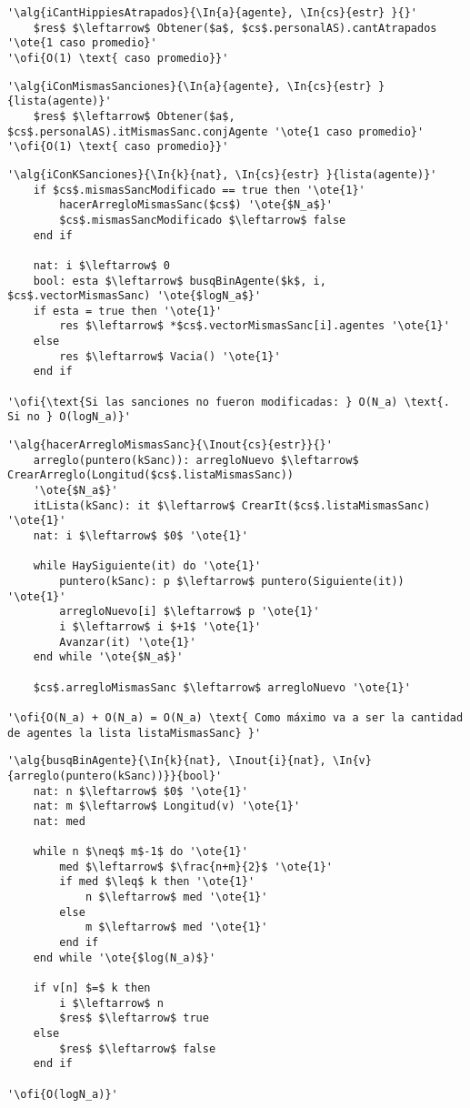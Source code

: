 \begin{lstlisting}[mathescape]
'\alg{iCantHippiesAtrapados}{\In{a}{agente}, \In{cs}{estr} }{}'
	$res$ $\leftarrow$ Obtener($a$, $cs$.personalAS).cantAtrapados '\ote{1 caso promedio}'
'\ofi{O(1) \text{ caso promedio}}'
\end{lstlisting}

\begin{lstlisting}[mathescape]
'\alg{iConMismasSanciones}{\In{a}{agente}, \In{cs}{estr} }{lista(agente)}'
	$res$ $\leftarrow$ Obtener($a$, $cs$.personalAS).itMismasSanc.conjAgente '\ote{1 caso promedio}'
'\ofi{O(1) \text{ caso promedio}}'
\end{lstlisting}

\begin{lstlisting}[mathescape]
'\alg{iConKSanciones}{\In{k}{nat}, \In{cs}{estr} }{lista(agente)}'
	if $cs$.mismasSancModificado == true then '\ote{1}'
		hacerArregloMismasSanc($cs$) '\ote{$N_a$}'
		$cs$.mismasSancModificado $\leftarrow$ false
	end if

	nat: i $\leftarrow$ 0
	bool: esta $\leftarrow$ busqBinAgente($k$, i, $cs$.vectorMismasSanc) '\ote{$logN_a$}'
	if esta = true then '\ote{1}'
		res $\leftarrow$ *$cs$.vectorMismasSanc[i].agentes '\ote{1}'
	else
		res $\leftarrow$ Vacia() '\ote{1}'
	end if

'\ofi{\text{Si las sanciones no fueron modificadas: } O(N_a) \text{. Si no } O(logN_a)}'
\end{lstlisting}

\begin{lstlisting}[mathescape]
'\alg{hacerArregloMismasSanc}{\Inout{cs}{estr}}{}'
	arreglo(puntero(kSanc)): arregloNuevo $\leftarrow$ CrearArreglo(Longitud($cs$.listaMismasSanc))
	'\ote{$N_a$}'
	itLista(kSanc): it $\leftarrow$ CrearIt($cs$.listaMismasSanc) '\ote{1}'
	nat: i $\leftarrow$ $0$ '\ote{1}'

	while HaySiguiente(it) do '\ote{1}'
		puntero(kSanc): p $\leftarrow$ puntero(Siguiente(it)) '\ote{1}'
		arregloNuevo[i] $\leftarrow$ p '\ote{1}'
		i $\leftarrow$ i $+1$ '\ote{1}'
		Avanzar(it) '\ote{1}'
	end while '\ote{$N_a$}'

	$cs$.arregloMismasSanc $\leftarrow$ arregloNuevo '\ote{1}'

'\ofi{O(N_a) + O(N_a) = O(N_a) \text{ Como máximo va a ser la cantidad de agentes la lista listaMismasSanc} }'
\end{lstlisting}

\begin{lstlisting}[mathescape]
'\alg{busqBinAgente}{\In{k}{nat}, \Inout{i}{nat}, \In{v}{arreglo(puntero(kSanc))}}{bool}'
	nat: n $\leftarrow$ $0$ '\ote{1}'
	nat: m $\leftarrow$ Longitud(v) '\ote{1}'
	nat: med

	while n $\neq$ m$-1$ do '\ote{1}'
		med $\leftarrow$ $\frac{n+m}{2}$ '\ote{1}'
		if med $\leq$ k then '\ote{1}'
			n $\leftarrow$ med '\ote{1}'
		else
			m $\leftarrow$ med '\ote{1}'
		end if
	end while '\ote{$log(N_a)$}'

	if v[n] $=$ k then
		i $\leftarrow$ n
		$res$ $\leftarrow$ true
	else
		$res$ $\leftarrow$ false
	end if

'\ofi{O(logN_a)}'

\end{lstlisting}

